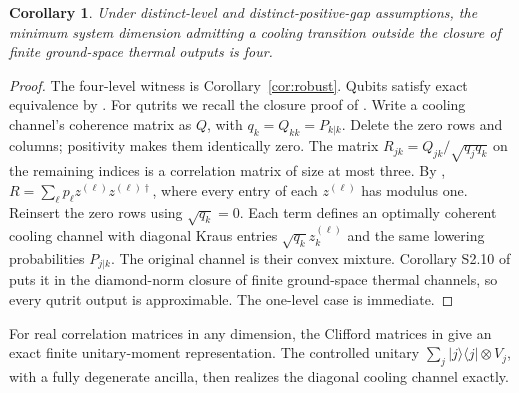 \documentclass[11pt]{article}
\newtheorem{corollary}{Corollary}
\newcommand{\ket}[1]{\lvert #1\rangle}
\newcommand{\bra}[1]{\langle #1\rvert}
\begin{document}
\begin{corollary}\label{cor:threshold}
Under distinct-level and distinct-positive-gap assumptions, the minimum
system dimension admitting a cooling transition outside the closure of
finite ground-space thermal outputs is four.
\end{corollary}
\begin{proof}
The four-level witness is Corollary~\ref{cor:robust}. Qubits satisfy exact
equivalence by \cite[Corollary S2.7]{NG}. For qutrits we recall the closure
proof of \cite[Supplement, pp.\ 1--2]{MA}. Write a cooling channel's
coherence matrix as $Q$, with $q_k=Q_{kk}=P_{k|k}$. Delete the zero
rows and columns; positivity makes them identically zero. The matrix
$R_{jk}=Q_{jk}/\sqrt{q_jq_k}$ on the remaining indices is a correlation
matrix of size at most three. By \cite[Corollary 2.8]{DJ},
$R=\sum_\ell p_\ell z^{(\ell)}z^{(\ell)\dagger}$, where every entry
of each $z^{(\ell)}$ has modulus one. Reinsert the zero rows using
$\sqrt{q_k}=0$. Each term defines an optimally coherent cooling channel
with diagonal Kraus entries $\sqrt{q_k}z_k^{(\ell)}$ and the same lowering
probabilities $P_{j|k}$. The original channel is their convex mixture.
Corollary S2.10 of \cite{NG} puts it in the diamond-norm closure of
finite ground-space thermal channels, so every qutrit output is
approximable. The one-level case is immediate.
\end{proof}

For real correlation matrices
in any dimension, the Clifford matrices in \cite[Theorem 3.1]{DJ} give
an exact finite unitary-moment representation. The controlled unitary
$\sum_j\ket j\bra j\otimes V_j$, with a fully degenerate ancilla,
then realizes the diagonal cooling channel exactly.
\end{document}
